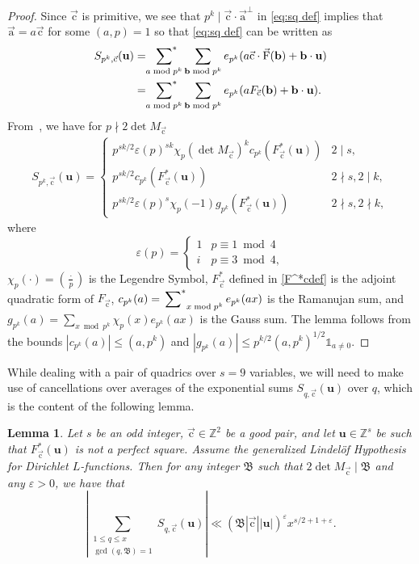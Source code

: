 \documentclass[letterpaper,11pt]{amsart}
\numberwithin{equation}{section}
\newtheorem{lemma}[theorem]{Lemma}
\theoremstyle{definition}
\numberwithin{equation}{section}
\newcommand{\ZZ}{\mathbb{Z}}
\newcommand{\uu}{\mathbf{u}}
\newcommand{\bb}{\mathbf{b}}
\newcommand{\starsum}{\sideset{}{^*}\sum}
\newcommand{\ua}{\vec{\mathrm{a}}}
\newcommand{\uF}{{\vec{\mathrm{F}} }}
\newcommand{\uc}{{\vec{\mathrm{c}}}}
\begin{document}
\begin{proof}
Since $\uc$ is primitive, we see that $p^k\mid \uc \cdot \ua^{\perp}$ in \eqref{eq:sq def} implies that $\ua=a\uc$ for some $(a,p)=1$ so that \eqref{eq:sq def} can be written as 
\begin{align*}
S_{p^k, \uc}(\uu)&=\starsum_{a\bmod p^k}\sum_{\bb\bmod {p^k}}e_{p^k}(a\uc\cdot \uF  (\bb)+\bb\cdot \uu)\\&=\starsum_{a\bmod p^k}\sum_{\bb\bmod {p^k}}e_{p^k}(a F_{\uc}(\bb)+\bb\cdot \uu).
\end{align*}
From~\cite[Lemma 15]{BM}, we have 
for $p\nmid 2\det M_{\uc}$ 
	\begin{align}\label{Spkucuu}S_{p^k, \uc}(\uu)=\begin{cases}
p^{sk/2}\varepsilon(p)^{sk}\chi_p(\det M_\uc)^k c_{p^k}(F_\uc^*(\uu)) & 2\mid s,\\
p^{sk/2} c_{p^k}(F_\uc^*(\uu)) & 2\nmid s, 2\mid k,\\
p^{sk/2} \varepsilon(p)^{s}\chi_p(-1)g_{p^k}(F_\uc^*(\uu)) & 2\nmid s, 2\nmid k,
\end{cases}
\end{align}
	where $$\varepsilon(p)=\begin{cases}
	1   &p\equiv 1 \bmod 4\\ 
	i & p \equiv 3\bmod 4,
	\end{cases}$$  $\chi_p(\cdot)=(\frac{\cdot}{p})$ is the Legendre Symbol, $F_{\uc}^*$ defined in \eqref{F^*cdef} is the adjoint quadratic form of $F_{\uc}$, $c_{p^k}(a)=\starsum_{x\bmod{p^k}}e_{p^k}(ax) $ is the Ramanujan sum, and
	$g_{p^k}(a)=\sum_{x\bmod {p^k}}\chi_p(x)e_{p^k}(ax)$ is the Gauss sum.
The lemma follows from the bounds $|c_{p^k}(a)|\leq (a, p^k)$ and $|g_{p^k}(a)|\leq p^{k/2}(a, p^k)^{1/2}\mathds 1_{a\not=0}$.
\end{proof}
While dealing with a pair of quadrics over $s=9$ variables, we will need to make use of cancellations over averages of the exponential sums $S_{q,\uc}(\uu)$ over $q$,  which is the content of the following lemma.
\begin{lemma}\label{hypo:GRH}
Let $s$ be an odd integer, $\uc\in\ZZ^2$ be a good pair, and let $\uu\in\ZZ^s$ be such that $F_\uc^*(\uu)$ is not a perfect square. Assume the generalized Lindel\"of Hypothesis for Dirichlet $L$-functions. Then for any integer $\mathfrak B$ such that $2\det M_{\uc}\mid \mathfrak B$ and any $\varepsilon>0$, we have that 
\begin{equation*}
|\sum_{\substack{1\leq q\leq x\\ \gcd(q,\mathfrak B)=1 }}S_{q,\uc}(\uu)|\ll (\mathfrak B|\uc| |\uu|)^\varepsilon x^{s/2+1+\varepsilon}.
\end{equation*}
\end{lemma}
\end{document}

